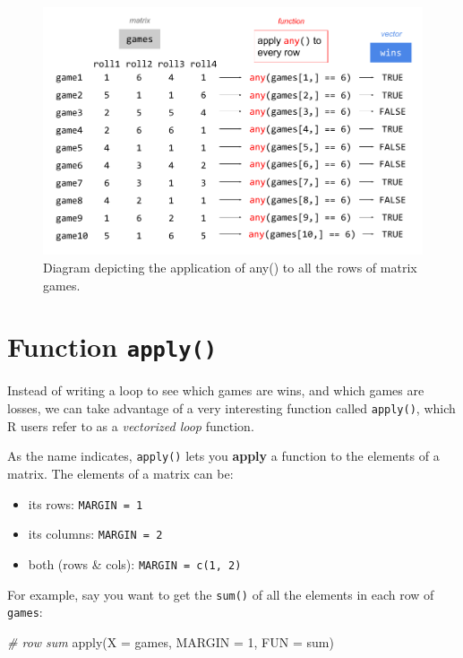 \documentclass[
]{book}
\newenvironment{Shaded}{\begin{snugshade}}{\end{snugshade}}
\newcommand{\AttributeTok}[1]{\textcolor[rgb]{0.77,0.63,0.00}{#1}}
\newcommand{\CommentTok}[1]{\textcolor[rgb]{0.56,0.35,0.01}{\textit{#1}}}
\newcommand{\DecValTok}[1]{\textcolor[rgb]{0.00,0.00,0.81}{#1}}
\newcommand{\FunctionTok}[1]{\textcolor[rgb]{0.00,0.00,0.00}{#1}}
\newcommand{\NormalTok}[1]{#1}
\begin{document}
\begin{figure}

{\centering \includegraphics[width=0.9\linewidth]{images/demere-10-games-any} 

}

\caption{Diagram depicting the application of any() to all the rows of matrix games.}\label{fig:unnamed-chunk-29}
\end{figure}

\hypertarget{function-apply}{%
\section{\texorpdfstring{Function \texttt{apply()}}{Function apply()}}\label{function-apply}}

Instead of writing a loop to see which games are wins, and which games are
losses, we can take advantage of a very interesting function called \texttt{apply()},
which R users refer to as a \emph{vectorized loop} function.

As the name indicates, \texttt{apply()} lets you \textbf{apply} a function to the elements
of a matrix. The elements of a matrix can be:

\begin{itemize}
\item
  its rows: \texttt{MARGIN\ =\ 1}
\item
  its columns: \texttt{MARGIN\ =\ 2}
\item
  both (rows \& cols): \texttt{MARGIN\ =\ c(1,\ 2)}
\end{itemize}

For example, say you want to get the \texttt{sum()} of all the elements in each
row of \texttt{games}:

\begin{Shaded}
\begin{Highlighting}[]
\CommentTok{\# row sum}
\FunctionTok{apply}\NormalTok{(}\AttributeTok{X =}\NormalTok{ games, }\AttributeTok{MARGIN =} \DecValTok{1}\NormalTok{, }\AttributeTok{FUN =}\NormalTok{ sum)}
\end{Highlighting}
\end{Shaded}
\end{document}
